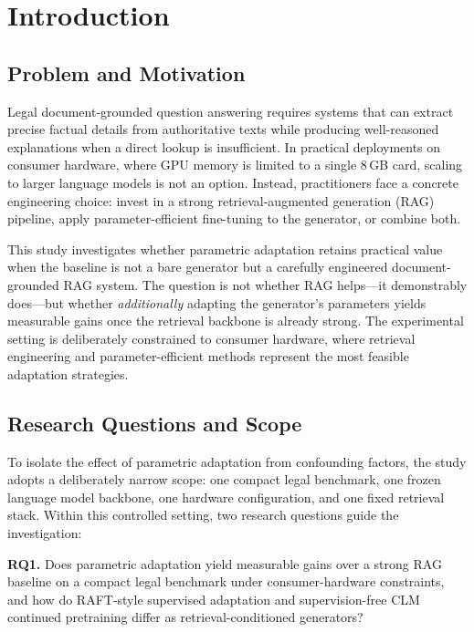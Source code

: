
\section{Introduction}

\subsection{Problem and Motivation}

Legal document-grounded question answering requires systems that can extract precise factual details from authoritative texts while producing well-reasoned explanations when a direct lookup is insufficient. In practical deployments on consumer hardware, where GPU memory is limited to a single 8\,GB card, scaling to larger language models is not an option. Instead, practitioners face a concrete engineering choice: invest in a strong retrieval-augmented generation (RAG) pipeline, apply parameter-efficient fine-tuning to the generator, or combine both.

This study investigates whether parametric adaptation retains practical value when the baseline is not a bare generator but a carefully engineered document-grounded RAG system. The question is not whether RAG helps---it demonstrably does---but whether \emph{additionally} adapting the generator's parameters yields measurable gains once the retrieval backbone is already strong. The experimental setting is deliberately constrained to consumer hardware, where retrieval engineering and parameter-efficient methods represent the most feasible adaptation strategies.

\subsection{Research Questions and Scope}

To isolate the effect of parametric adaptation from confounding factors, the study adopts a deliberately narrow scope: one compact legal benchmark, one frozen language model backbone, one hardware configuration, and one fixed retrieval stack. Within this controlled setting, two research questions guide the investigation:

\textbf{RQ1.} Does parametric adaptation yield measurable gains over a strong RAG baseline on a compact legal benchmark under consumer-hardware constraints, and how do RAFT-style supervised adaptation and supervision-free CLM continued pretraining differ as retrieval-conditioned generators?

